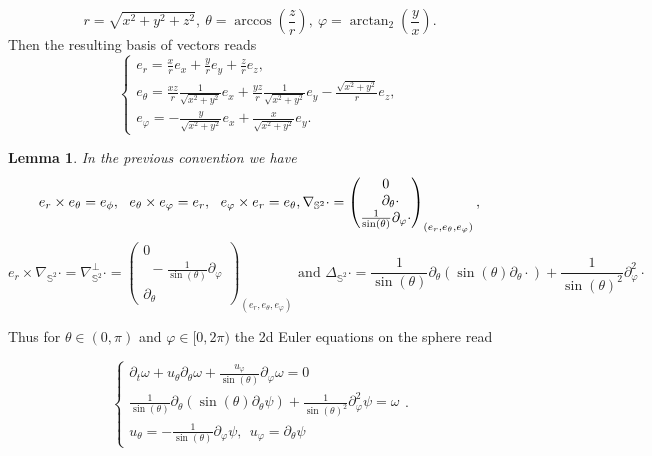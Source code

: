 \documentclass[10pt]{article}
\numberwithin{equation}{section}
\theoremstyle{plain}
\newtheorem{lemma}{Lemma}[section]
\theoremstyle{definition}
\newcommand{\prt}[1]{\left( #1 \right)}
\numberwithin{equation}{section}
\begin{document}

\[
r=\sqrt{x^2+y^2+z^2}, \ \theta=\arccos\prt{\frac{z}{r}}, \ \varphi=\arctan_2\prt{\frac{y}{x}}.
\]
Then the resulting basis of vectors reads
\[
\begin{cases}
e_r=\frac{x}{r}e_x+\frac{y}{r}e_y+\frac{z}{r}e_z, \\
e_\theta=\frac{xz}{r}\frac{1}{\sqrt{x^2+y^2}}e_x+\frac{yz}{r}\frac{1}{\sqrt{x^2+y^2}}e_y-\frac{\sqrt{x^2+y^2}}{r}e_z, \\
e_\varphi=-\frac{y}{\sqrt{x^2+y^2}}e_x+\frac{x}{\sqrt{x^2+y^2}}e_y.
\end{cases}\]

\begin{lemma}\label{Sphere:spherical coord}
In the previous convention we have 
\[
e_r\times e_\theta=e_\phi, \ \ e_{\theta}\times e_\varphi=e_r , \ \ e_{\varphi}\times e_r=e_\theta, \\ \nabla_{\mathbb{S}^2}\cdot =\begin{pmatrix}
0 \\
\ \ \partial_\theta\cdot \\
\frac{1}{\sin(\theta)}\partial_\varphi\cdot 
\end{pmatrix}_{(e_r,e_\theta,e_\varphi)},
\]
\[
e_r \times \nabla_{\mathbb{S}^2} \cdot =\nabla^\perp_{\mathbb{S}^2}\cdot =\begin{pmatrix}
0 \\
\ \ -\frac{1}{\sin(\theta)}\partial_\varphi\\
\partial_\theta
\end{pmatrix}_{(e_r,e_\theta,e_\varphi)} \text{ and } \Delta_{\mathbb{S}^2}\cdot  =\frac{1}{\sin(\theta)}\partial_\theta\prt{\sin(\theta)\partial_\theta \cdot  }+\frac{1}{\sin(\theta)^2}\partial_\varphi^2 \cdot 
\]
\end{lemma}

Thus for $\theta \in (0,\pi)$ and $\varphi \in [0,2\pi)$ the 2d Euler equations on the sphere read

\begin{equation}\label{eq:2d E on the sphere}
\begin{cases}
    \partial_t \omega+u_\theta \partial_\theta \omega+\frac{u_\varphi}{\sin(\theta)}\partial_\varphi \omega=0\\
    \frac{1}{\sin(\theta)}\partial_\theta\prt{\sin(\theta)\partial_\theta \psi}+\frac{1}{\sin(\theta)^2}\partial_\varphi^2 \psi=\omega\\
    u_\theta=-\frac{1}{\sin(\theta)}\partial_\varphi \psi, \ \   u_\varphi=\partial_\theta \psi
    \end{cases}.
\end{equation}
\end{document}
